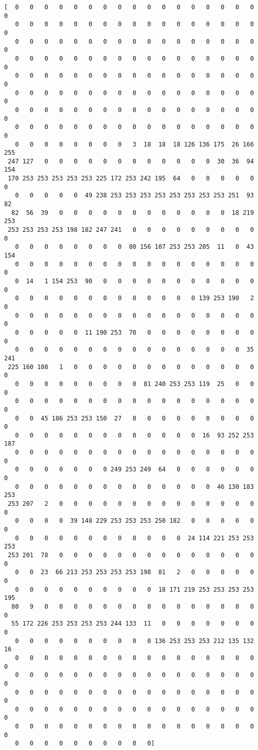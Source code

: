 \documentclass[11pt]{article}
\begin{document}
    \begin{Verbatim}[commandchars=\\\{\}]
[  0   0   0   0   0   0   0   0   0   0   0   0   0   0   0   0   0   0
   0   0   0   0   0   0   0   0   0   0   0   0   0   0   0   0   0   0
   0   0   0   0   0   0   0   0   0   0   0   0   0   0   0   0   0   0
   0   0   0   0   0   0   0   0   0   0   0   0   0   0   0   0   0   0
   0   0   0   0   0   0   0   0   0   0   0   0   0   0   0   0   0   0
   0   0   0   0   0   0   0   0   0   0   0   0   0   0   0   0   0   0
   0   0   0   0   0   0   0   0   0   0   0   0   0   0   0   0   0   0
   0   0   0   0   0   0   0   0   0   0   0   0   0   0   0   0   0   0
   0   0   0   0   0   0   0   0   3  18  18  18 126 136 175  26 166 255
 247 127   0   0   0   0   0   0   0   0   0   0   0   0  30  36  94 154
 170 253 253 253 253 253 225 172 253 242 195  64   0   0   0   0   0   0
   0   0   0   0   0  49 238 253 253 253 253 253 253 253 253 251  93  82
  82  56  39   0   0   0   0   0   0   0   0   0   0   0   0  18 219 253
 253 253 253 253 198 182 247 241   0   0   0   0   0   0   0   0   0   0
   0   0   0   0   0   0   0   0  80 156 107 253 253 205  11   0  43 154
   0   0   0   0   0   0   0   0   0   0   0   0   0   0   0   0   0   0
   0  14   1 154 253  90   0   0   0   0   0   0   0   0   0   0   0   0
   0   0   0   0   0   0   0   0   0   0   0   0   0 139 253 190   2   0
   0   0   0   0   0   0   0   0   0   0   0   0   0   0   0   0   0   0
   0   0   0   0   0  11 190 253  70   0   0   0   0   0   0   0   0   0
   0   0   0   0   0   0   0   0   0   0   0   0   0   0   0   0  35 241
 225 160 108   1   0   0   0   0   0   0   0   0   0   0   0   0   0   0
   0   0   0   0   0   0   0   0   0  81 240 253 253 119  25   0   0   0
   0   0   0   0   0   0   0   0   0   0   0   0   0   0   0   0   0   0
   0   0  45 186 253 253 150  27   0   0   0   0   0   0   0   0   0   0
   0   0   0   0   0   0   0   0   0   0   0   0   0  16  93 252 253 187
   0   0   0   0   0   0   0   0   0   0   0   0   0   0   0   0   0   0
   0   0   0   0   0   0   0 249 253 249  64   0   0   0   0   0   0   0
   0   0   0   0   0   0   0   0   0   0   0   0   0   0  46 130 183 253
 253 207   2   0   0   0   0   0   0   0   0   0   0   0   0   0   0   0
   0   0   0   0  39 148 229 253 253 253 250 182   0   0   0   0   0   0
   0   0   0   0   0   0   0   0   0   0   0   0  24 114 221 253 253 253
 253 201  78   0   0   0   0   0   0   0   0   0   0   0   0   0   0   0
   0   0  23  66 213 253 253 253 253 198  81   2   0   0   0   0   0   0
   0   0   0   0   0   0   0   0   0   0  18 171 219 253 253 253 253 195
  80   9   0   0   0   0   0   0   0   0   0   0   0   0   0   0   0   0
  55 172 226 253 253 253 253 244 133  11   0   0   0   0   0   0   0   0
   0   0   0   0   0   0   0   0   0   0 136 253 253 253 212 135 132  16
   0   0   0   0   0   0   0   0   0   0   0   0   0   0   0   0   0   0
   0   0   0   0   0   0   0   0   0   0   0   0   0   0   0   0   0   0
   0   0   0   0   0   0   0   0   0   0   0   0   0   0   0   0   0   0
   0   0   0   0   0   0   0   0   0   0   0   0   0   0   0   0   0   0
   0   0   0   0   0   0   0   0   0   0   0   0   0   0   0   0   0   0
   0   0   0   0   0   0   0   0   0   0]


\end{Verbatim}
\end{document}
